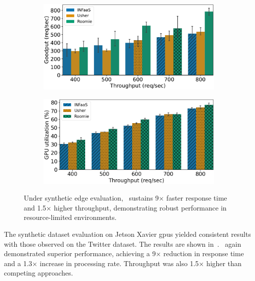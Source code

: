 \begin{figure}[h!]
	\begin{subfigure}[b]{0.45\textwidth}
		\centering
		\includegraphics[width=\textwidth]{chapters/roomie/images/JetsonNano/synthetic-all-models/goodput.pdf}
	\end{subfigure}
	\hfill
	\begin{subfigure}[b]{0.45\textwidth}
		\centering
		\includegraphics[width=\textwidth]{chapters/roomie/images/JetsonNano/synthetic-all-models/gpu_utilization.png}
	\end{subfigure}
	\caption{Under synthetic edge evaluation,~\roomie{} sustains 9× faster response time and 1.5× higher throughput, demonstrating robust performance in resource-limited environments.}
	\label{fig:JetsonNano/synthetic-all-models}
	\vspace{-3mm}
\end{figure}

The synthetic dataset evaluation on Jetson Xavier \acrshort{gpu}s yielded consistent results with those observed on the Twitter dataset. The results are shown in~.~\roomie{} again demonstrated superior performance, achieving a 9× reduction in response time and a 1.3× increase in processing rate. Throughput was also 1.5× higher than competing approaches.

